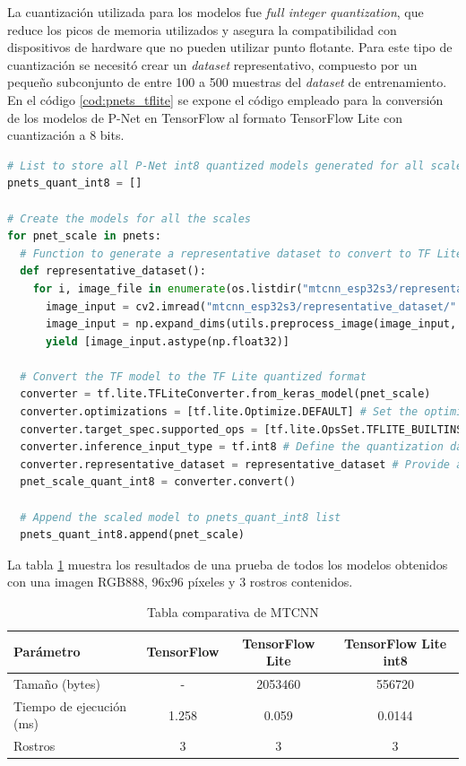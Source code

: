 La cuantización utilizada para los modelos fue \textit{full integer quantization}, que reduce los picos de memoria utilizados y asegura la compatibilidad con dispositivos de hardware que no pueden utilizar punto flotante. Para este tipo de cuantización se necesitó crear un \textit{dataset} representativo, compuesto por un pequeño subconjunto de entre 100 a 500 muestras del \textit{dataset} de entrenamiento. En el código \ref{cod:pnets_tflite} se expone el código empleado para la conversión de los modelos de P-Net en TensorFlow al formato TensorFlow Lite con cuantización a 8 bits.

\begin{lstlisting}[language=Python, label=cod:pnets_tflite, caption=Código para crear los modelos de P-Net con TensorFlow Lite con cuantización de 8 bits.]
# List to store all P-Net int8 quantized models generated for all scales
pnets_quant_int8 = []

# Create the models for all the scales
for pnet_scale in pnets:
  # Function to generate a representative dataset to convert to TF Lite quantized
  def representative_dataset():
    for i, image_file in enumerate(os.listdir("mtcnn_esp32s3/representative_dataset/")):
      image_input = cv2.imread("mtcnn_esp32s3/representative_dataset/" + image_file)
      image_input = np.expand_dims(utils.preprocess_image(image_input, hs, ws, np.float32), axis=0)
      yield [image_input.astype(np.float32)]

  # Convert the TF model to the TF Lite quantized format 
  converter = tf.lite.TFLiteConverter.from_keras_model(pnet_scale)
  converter.optimizations = [tf.lite.Optimize.DEFAULT] # Set the optimization flag
  converter.target_spec.supported_ops = [tf.lite.OpsSet.TFLITE_BUILTINS_INT8] # Enforce integer only quantization
  converter.inference_input_type = tf.int8 # Define the quantization data type
  converter.representative_dataset = representative_dataset # Provide a representative dataset to ensure we quantize correctly.
  pnet_scale_quant_int8 = converter.convert()

  # Append the scaled model to pnets_quant_int8 list
  pnets_quant_int8.append(pnet_scale)
\end{lstlisting}

La tabla \ref{tab:models_comp} muestra los resultados de una prueba de todos los modelos obtenidos con una imagen RGB888, 96x96 píxeles y 3 rostros contenidos.

\begin{table}[h]
	\centering
	\caption[Modelos comparativa]{Tabla comparativa de MTCNN}
	\begin{tabular}{lccc}   
		\toprule
		\textbf{Parámetro} & \textbf{TensorFlow} & \textbf{TensorFlow Lite} & \textbf{TensorFlow Lite int8} \\
		\midrule
		Tamaño (bytes) & - & 2053460 &  556720 \\
		Tiempo de ejecución (ms) & 1.258 & 0.059 & 0.0144 \\
		Rostros & 3 & 3 & 3 \\
		\bottomrule
		\hline
	\end{tabular}
	\label{tab:models_comp}
\end{table}

